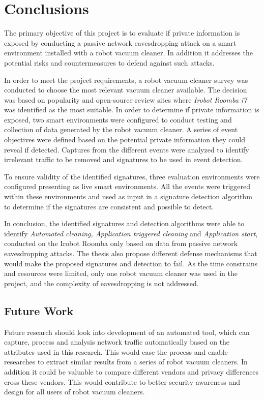 \chapter{Conclusions}
The primary objective of this project is to evaluate if private information is exposed by conducting a passive network eavesdropping attack on a smart environment installed with a robot vacuum cleaner. In addition it addresses the potential risks and countermeasures to defend against such attacks.

In order to meet the project requirements, a robot vacuum cleaner survey was conducted to choose the most relevant vacuum cleaner available. The decision was based on popularity and open-source review sites where \textit{Irobot Roomba i7} was identified as the most suitable. In order to determine if private information is exposed, two smart environments were configured to conduct testing and collection of data generated by the robot vacuum cleaner. A series of event objectives were defined based on the potential private information they could reveal if detected. Captures from the different events were analyzed to identify irrelevant traffic to be removed and signatures to be used in event detection. 

To ensure validity of the identified signatures, three evaluation environments were configured presenting as live smart environments. All the events were triggered within these environments and used as input in a signature detection algorithm to determine if the signatures are consistent and possible to detect. 

In conclusion, the identified signatures and detection algorithms were able to identify \textit{Automated cleaning, Application triggered cleaning} and \textit{Application start}, conducted on the Irobot Roomba only based on data from passive network eavesdropping attacks. The thesis also propose different defense mechanisms that would make the proposed signatures and detection to fail. As the time constrains and resources were limited, only one robot vacuum cleaner was used in the project, and the complexity of eavesdropping is not addressed. 

\section{Future Work}
Future research should look into development of an automated tool, which can capture, process and analysis network traffic automatically based on the attributes used in this research. This would ease the process and enable researches to extract similar results from a series of robot vacuum cleaners. In addition it could be valuable to compare different vendors and privacy differences cross these vendors. This would contribute to better security awareness and design for all users of robot vacuum cleaners. 

